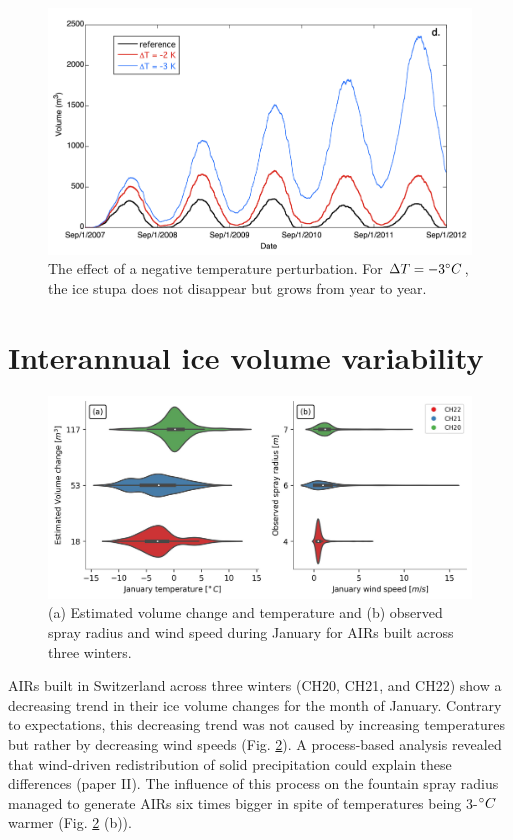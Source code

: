 \begin{figure}
	\centering
	\includegraphics[width=\textwidth]{figs/PIR_evolution.png}
	\caption{The effect of a negative temperature perturbation. For $\Delta T = -3 ^{\circ} C$, the ice stupa does
		not disappear but grows from year to year.}
	\label{fig:PIR_evolution}
\end{figure}


\section{Interannual ice volume variability}
\label{sec:interannual}

\begin{figure}
	\centering
	\includegraphics[width=\textwidth]{figs/CH_diffs.jpg}
	\caption{(a) Estimated volume change and temperature and (b) observed spray radius and wind speed
		during January for \ac{AIRs} built across three winters. }
	\label{fig:CH_diffs}
\end{figure}

\ac{AIRs} built in Switzerland across three winters (CH20, CH21, and CH22) show a decreasing trend in their ice volume
changes for the month of January. Contrary to expectations, this decreasing trend was not caused by increasing
temperatures but rather by decreasing wind speeds (Fig. \ref{fig:CH_diffs}). A process-based analysis revealed
that wind-driven redistribution of solid precipitation could explain these differences (paper II). The influence of this process on
the fountain spray radius managed to generate \ac{AIRs} six times bigger in spite of temperatures being 3-$^{\circ} C$
warmer (Fig. \ref{fig:CH_diffs} (b)).



